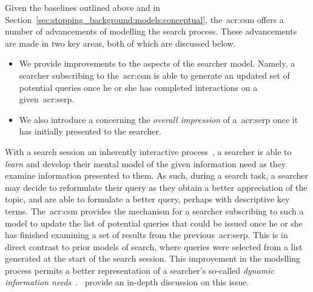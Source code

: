 Given the baselines outlined above and in Section~\ref{sec:stopping_background:models:conceptual}, the~\gls{acr:csm} offers a number of advancements of modelling the search process. These advancements are made in two key areas, both of which are discussed below.

\begin{itemize}
    \item{We provide improvements to the  aspects of the searcher model. Namely, a searcher subscribing to the~\gls{acr:csm} is able to generate an updated set of potential queries once he or she has completed interactions on a given~\gls{acr:serp}.}
    \item{We also introduce a  concerning the \emph{overall impression} of a~\gls{acr:serp} once it has initially presented to the searcher.}
\end{itemize}

\noindent
{} With a search session an inherently interactive process~\citep{ingwersen2005theturn}, a searcher is able to \emph{learn} and develop their mental model of the given information need as they examine information presented to them. As such, during a search task, a searcher may decide to reformulate their query as they obtain a better appreciation of the topic, and are able to formulate a better query, perhaps with descriptive key terms. The~\gls{acr:csm} provides the mechanism for a searcher subscribing to such a model to update the list of potential queries that could be issued once he or she has finished examining a set of results from the previous~\gls{acr:serp}. This is in direct contrast to prior models of search, where queries were selected from a list generated at the start of the search session. This improvement in the modelling process permits a better representation of a searcher's so-called \emph{dynamic information needs}~\citep{borlund2003iir_model}.~\cite{maxwell2016agents} provide an in-depth discussion on this issue.

